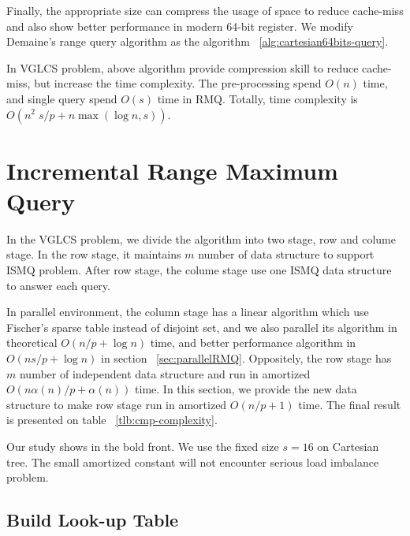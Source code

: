 Finally, the appropriate size can compress the usage of space to
reduce cache-miss and also show better performance in modern 64-bit
register.  We modify Demaine's range query algorithm as the algorithm
~\ref{alg:cartesian64bits-query}.





In VGLCS problem, above algorithm provide compression skill to reduce
cache-miss, but increase the time complexity. The pre-processing spend
$O(n)$ time, and single query spend $O(s)$ time in RMQ. Totally, time
complexity is $O(n^2 \; s / p + n \max(\log n, s))$.


\section{Incremental Range Maximum Query}

In the VGLCS problem, we divide the algorithm into two stage, row and
colume stage. In the row stage, it maintains $m$ number of data
structure to support ISMQ problem. After row stage, the colume stage
use one ISMQ data structure to answer each query.

In parallel environment, the column stage has a linear algorithm which
use Fischer's sparse table instead of disjoint set, and we also
parallel its algorithm in theoretical $O(n / p + \log n)$ time, and
better performance algorithm in $O(n s / p + \log n)$ in section
~\ref{sec:parallelRMQ}.  Oppositely, the row stage has $m$ number of
independent data structure and run in amortized $O(n \alpha(n) / p +
\alpha(n))$ time.  In this section, we provide the new data structure
to make row stage run in amortized $O(n / p + 1)$ time. The final
result is presented on table ~\ref{tlb:cmp-complexity}.

\begin{table*}
  \centering
  

  \caption{   Our study shows in the bold front. We use the fixed size
$s=16$ on Cartesian tree. The small amortized constant will not
encounter serious load imbalance problem.   }

  \label{tlb:cmp-complexity}
\end{table*}

\subsection{Build Look-up Table}

